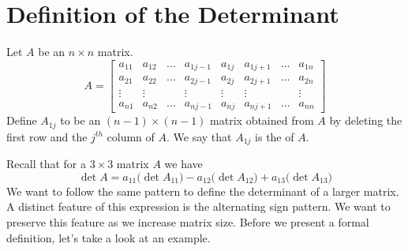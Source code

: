 \documentclass{ximera}
\begin{document}
\section*{Definition of the Determinant}
Let $A$ be an $n\times n$ matrix. 
$$A=\begin{bmatrix}a_{11} & a_{12} & \dots & a_{1j-1} & a_{1j} & a_{1j+1} & \dots & a_{1n}  \\
    a_{21} & a_{22} & \dots & a_{2j-1} & a_{2j} & a_{2j+1} & \dots & a_{2n}  \\
   \vdots & \vdots &  & \vdots & \vdots & \vdots &  & \vdots  \\
   a_{n1} & a_{n2} & \dots & a_{nj-1} & a_{nj} & a_{nj+1} & \dots & a_{nn}\end{bmatrix}$$
   Define $A_{1j}$ to be an $(n-1)\times (n-1)$ matrix obtained from $A$ by deleting the first row and the $j^{th}$ column of $A$.  We say that $A_{1j}$ is the  of $A$.
\begin{center}
 \end{center} 
Recall that for a $3\times 3$ matrix $A$ we have
$$\det{A}=a_{11}\big(\det{A_{11}}\big)-a_{12}\big(\det{A_{12}}\big)+a_{13}\big(\det{A_{13}}\big)$$
We want to follow the same pattern  to define the determinant of a larger matrix.  A distinct feature of this expression is the alternating sign pattern.  We want to preserve this feature as we increase matrix size. Before we present a formal definition, let's take a look at an example.
\end{document}
